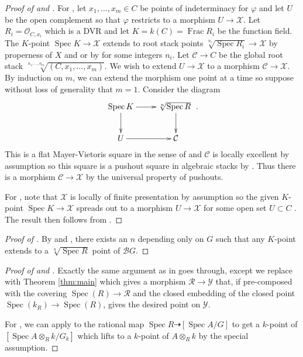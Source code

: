 \documentclass{amsart}
\theoremstyle{definition}
\newcommand{\cX}{\mathcal{X}}
\newcommand{\cY}{\mathcal{Y}}
\newcommand{\cO}{\mathcal{O}}
\newcommand{\cB}{\mathcal{B}}
\newcommand{\cC}{\mathcal{C}}
\newcommand{\cR}{\mathcal{R}}
\newcommand{\spec}{\operatorname{Spec}}
\begin{document}
\begin{proof}[Proof of  and ]

For , let $x_1, \ldots, x_m \in C$ be points of indeterminacy for $\varphi$ and let $U$ be the open complement so that $\varphi$ restricts to a morphism $U \to \cX$. Let $R_i = \cO_{C,x_i}$ which is a DVR and let $K = k(C) = \operatorname{Frac}R_i$ be the function field. The $K$-point $\spec K \to \cX$ extends to root stack points $\sqrt[n_i]{\spec R_i} \to \cX$ by properness of $X$ and  or by  for some integers $n_i$. Let $\cC \to C$ be the global root stack $\sqrt[n_1, \ldots, n_m]{(C, x_1, \ldots, x_m)}$. We wish to extend $U \to \cX$ to a morphism $\cC \to \cX$. By induction on $m$, we can extend the morphism one point at a time so suppose without loss of generality that $m = 1$.  Consider the diagram 
$$
\xymatrix{\spec K \ar[r] \ar[d] & \sqrt[n]{\spec R} \ \ar[d] \\ U \ar[r] & \cC}.
$$
This is a flat Mayer-Vietoris square in the sense of \cite[Definition 1.2]{MV} and $\cC$ is locally excellent by assumption so this square is a pushout square in algebraic stacks by \cite[Theorem A]{MV}. Thus there is a morphism $\cC \to \cX$ by the universal property of pushouts. 

For , note that $\cX$ is locally of finite presentation by assumption so the given $K$-point $\spec K \to \cX$ spreads out to a morphism $U \to \cX$ for some open set $U \subset C$ \cite[\href{https://stacks.math.columbia.edu/tag/0CMX}{Tag 0CMX}]{stacks-project}. The result then follows from . 
\end{proof}

\begin{proof}[Proof of ] By  and , there exists an $n$ depending only on $G$ such that any $K$-point extends to a $\sqrt[n]{\spec R}$ point of $\cB G$. 
\end{proof}


\begin{proof}[Proof of  and ] Exactly the same argument as in \cite[Theorem 4.1]{bresciani2024arithmetic} goes through, except we replace \cite[Corollary 3.2]{bresciani2024arithmetic} with Theorem \ref{thm:main} which gives a morphism $\cR\to \cY$ that, if pre-composed with the covering $\spec(R)\to \cR$ and the closed embedding of the closed point $\spec(k_R)\to \spec(R)$, gives the desired point on $\cY$. 

For , we can apply  to the rational map $\spec R \dashrightarrow [\spec A/G]$ to get a $k$-point of $[\spec A\otimes_R k/G_k]$ which lifts to a $k$-point of $A\otimes_R k$ by the special assumption.  
\end{proof} 
\end{document}
